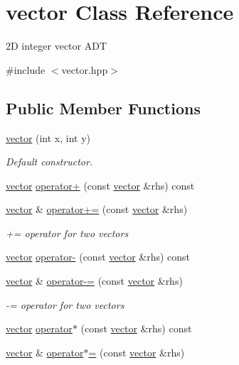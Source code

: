 \hypertarget{classvector}{}\section{vector Class Reference}
\label{classvector}


2D integer vector A\+DT  




{\ttfamily \#include $<$vector.\+hpp$>$}

\subsection*{Public Member Functions}
\begin{DoxyCompactItemize}
\item 
\hyperlink{classvector_a7fa147d3199381b9d8b32753bd1a6968}{vector} (int x, int y)
\begin{DoxyCompactList}\small\item\em Default constructor. \end{DoxyCompactList}\item 
\hyperlink{classvector}{vector} \hyperlink{classvector_a2ab7f62262c6f0c6ade3bd1879e6001e}{operator+} (const \hyperlink{classvector}{vector} \&rhs) const 
\item 
\hyperlink{classvector}{vector} \& \hyperlink{classvector_a401c12597814627f350a8cd663b6dba5}{operator+=} (const \hyperlink{classvector}{vector} \&rhs)
\begin{DoxyCompactList}\small\item\em += operator for two vectors \end{DoxyCompactList}\item 
\hyperlink{classvector}{vector} \hyperlink{classvector_ad9596a53b6aef33bbddfa7b9b4b17f09}{operator-\/} (const \hyperlink{classvector}{vector} \&rhs) const 
\item 
\hyperlink{classvector}{vector} \& \hyperlink{classvector_a9229a3d50eae5ce544f81419d49540ce}{operator-\/=} (const \hyperlink{classvector}{vector} \&rhs)
\begin{DoxyCompactList}\small\item\em -\/= operator for two vectors \end{DoxyCompactList}\item 
\hyperlink{classvector}{vector} \hyperlink{classvector_a925d23adbfbbbc9659e10d18cc4dba45}{operator$\ast$} (const \hyperlink{classvector}{vector} \&rhs) const 
\item 
\hyperlink{classvector}{vector} \& \hyperlink{classvector_ad7dba928c0f8e3bef217dd1d97ebfb8f}{operator$\ast$=} (const \hyperlink{classvector}{vector} \&rhs)

\end{DoxyCompactItemize}

